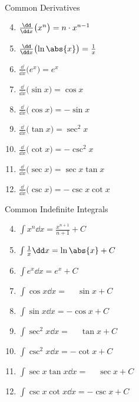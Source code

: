 {
\begin{theorem}\label{thm:common_indef_alg}%
\mbox{}\\[-2.5\baselineskip]
\parbox[t]{\linewidth}{\begin{multicols}{2}
Common Derivatives
\begin{enumerate}\setcounter{enumi}{3}
\item\label{thm:d_power_rule} $\frac{\dd}{\dd x}\bigl(x^n \bigr) = n\cdot x^{n-1}
\vphantom{\frac{x^n}n}$
\item\label{thm:d_ln_rule} $\frac{\dd}{\dd x}\bigl(\ln\abs{x}\bigr) = \frac1 x$
\item $\frac{\dd}{\dd x}\bigl(e^ x \bigr) = e^x$
\item $\frac{\dd}{\dd x}\bigl(\sin x \bigr) = \cos x$
\item $\frac{\dd}{\dd x}\bigl(\cos x \bigr) = -\sin x$
\item $\frac{\dd}{\dd x}\bigl(\tan x \bigr) = \sec^2 x$
\item $\frac{\dd}{\dd x}\bigl(\cot x \bigr) = -\csc^2 x$
\item $\frac{\dd}{\dd x}\bigl(\sec x \bigr) = \sec x\tan x$
\item $\frac{\dd}{\dd x}\bigl(\csc x \bigr) = -\csc x\cot x$ \quad\null
\end{enumerate}
\columnbreak
Common Indefinite Integrals
\begin{enumerate}\setcounter{enumi}{3}
\item $\int x^n\dd x =\frac{x^{n+1}}{n+1}+ C$
\item $\int \frac{1}x\dd x = \ln\abs{x}+C$
\item $\int e^x\dd x = e^x+C$
\item $\int \cos x\dd x = \phantom{-}\sin x+C$
\item $\int \sin x\dd x = -\cos x+C$
\item $\int \sec^2 x\dd x = \phantom{-}\tan x+C$
\item $\int \csc^2 x\dd x = -\cot x+C$
\item $\int \sec x\tan x\dd x = \phantom{-}\sec x+C$
\item $\int \csc x\cot  x\dd x = -\csc x+C$
\end{enumerate}
\end{multicols}}
\end{theorem}
}

